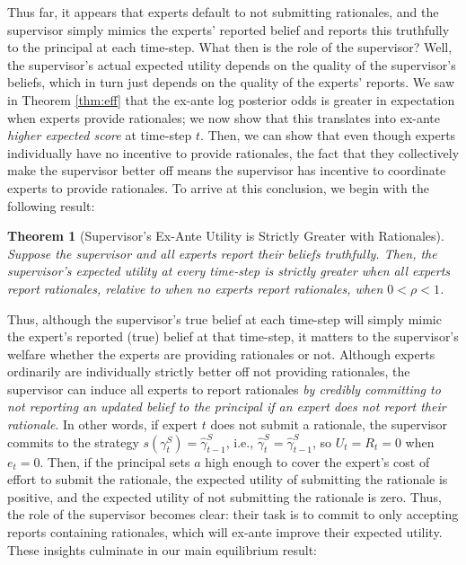 \documentclass{winnower}
\newtheorem{theorem}{Theorem}
\begin{document}
Thus far, it appears that experts default to not submitting rationales, and the supervisor simply mimics the experts' reported belief and reports this truthfully to the principal at each time-step. What then is the role of the supervisor? Well, the supervisor's actual expected utility depends on the quality of the supervisor's beliefs, which in turn just depends on the quality of the experts' reports. We saw in Theorem \ref{thm:eff} that the ex-ante log posterior odds is greater in expectation when experts provide rationales; we now show that this translates into ex-ante \emph{higher expected score} at time-step $t$. Then, we can show that even though experts individually have no incentive to provide rationales, the fact that they collectively make the supervisor better off means the supervisor has incentive to coordinate experts to provide rationales. To arrive at this conclusion, we begin with the following result:


\begin{theorem}[Supervisor's Ex-Ante Utility is Strictly Greater with Rationales]\label{thm:great}
    Suppose the supervisor and all experts report their beliefs truthfully. Then, the supervisor's expected utility at every time-step is strictly greater when all experts report rationales, relative to when no experts report rationales, when $0 < \rho < 1$.
\end{theorem}




Thus, although the supervisor's true belief at each time-step will simply mimic the expert's reported (true) belief at that time-step, it matters to the supervisor's welfare whether the experts are providing rationales or not. Although experts ordinarily are individually strictly better off not providing rationales, the supervisor can induce all experts to report rationales \emph{by credibly committing to not reporting an updated belief to the principal if an expert does not report their rationale}. In other words, if expert $t$ does not submit a rationale, the supervisor commits to the strategy $s({\gamma}_t^S) = \hat{\gamma}_{t-1}^S$, i.e., $\hat{\gamma}_t^S = \hat{\gamma}_{t-1}^S$, so $U_t = R_t = 0$ when $e_t = 0$. Then, if the principal sets $a$ high enough to cover the expert's cost of effort to submit the rationale, the expected utility of submitting the rationale is positive, and the expected utility of not submitting the rationale is zero. Thus, the role of the supervisor becomes clear: their task is to commit to only accepting reports containing rationales, which will ex-ante improve their expected utility. These insights culminate in our main equilibrium result:
\end{document}

